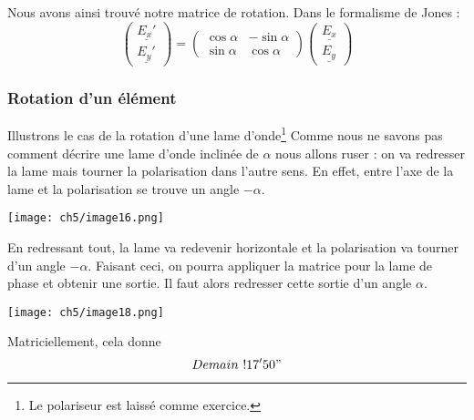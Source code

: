 	Nous avons ainsi trouvé notre matrice de rotation. Dans le formalisme de Jones :
	\begin{equation}
			\left(\begin{array}{c}
		\underline{E_x'}\\
		\underline{E_y'}
		\end{array}\right) = \left(\begin{array}{cc}
	\cos\alpha & -\sin\alpha\\
	\sin\alpha & \cos\alpha
	\end{array}\right)\left(\begin{array}{c}
		\underline{E_x}\\
		\underline{E_y}
		\end{array}\right)
	\end{equation}
	
		\subsubsection{Rotation d'un élément}
		Illustrons le cas de la rotation d'une lame d'onde\footnote{Le polariseur est laissé comme 
		exercice.} Comme nous ne savons pas comment décrire une lame d'onde inclinée de $\alpha$ nous 
		allons ruser : on va redresser la lame mais tourner la polarisation dans l'autre sens. En effet, 
		entre l'axe de la lame et la polarisation se trouve un angle $-\alpha$. 
\begin{center}
	\texttt{[image: ch5/image16.png]}
\end{center}		
		En redressant tout, 
		la lame va redevenir horizontale et la polarisation va tourner d'un angle $-\alpha$. Faisant 
		ceci, on pourra appliquer la matrice pour la lame de phase et obtenir une sortie. Il faut alors 
		redresser cette sortie d'un angle $\alpha$.
		\begin{center}
	\texttt{[image: ch5/image18.png]}
\end{center}	
		Matriciellement, cela donne
		\begin{equation}
		Demain\ ! 17'50"
		\end{equation}
	
	
	
	
	
	
	
	
	
	
	
	
	
	
	
	